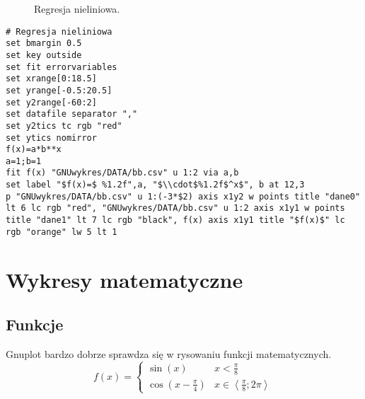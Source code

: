 \documentclass[a4paper,titlepage,12pt]{mwart}
\numberwithin{equation}{section}	%
\numberwithin{table}{section}           %
\numberwithin{figure}{section}          %
\begin{document}
\begin{figure}[!ht]
\begin{center}
\begin{scriptsize}
\end{scriptsize}
\end{center}
\caption{Regresja nieliniowa.}
\end{figure}
\begin{lstlisting}
# Regresja nieliniowa
set bmargin 0.5
set key outside
set fit errorvariables
set xrange[0:18.5]
set yrange[-0.5:20.5]
set y2range[-60:2]
set datafile separator ","
set y2tics tc rgb "red"
set ytics nomirror
f(x)=a*b**x
a=1;b=1
fit f(x) "GNUwykres/DATA/bb.csv" u 1:2 via a,b
set label "$f(x)=$ %1.2f",a, "$\\cdot$%1.2f$^x$", b at 12,3
p "GNUwykres/DATA/bb.csv" u 1:(-3*$2) axis x1y2 w points title "dane0" lt 6 lc rgb "red", "GNUwykres/DATA/bb.csv" u 1:2 axis x1y1 w points title "dane1" lt 7 lc rgb "black", f(x) axis x1y1 title "$f(x)$" lc rgb "orange" lw 5 lt 1
\end{lstlisting}

\section{Wykresy matematyczne}
\subsection{Funkcje}
Gnuplot bardzo dobrze sprawdza się w rysowaniu funkcji matematycznych. 
\begin{equation*}
f(x) = \begin{cases}
\sin(x) &x<\frac{\pi}{8}\\
\cos\left(x-\frac{\pi}{4}\right) &x\in\left\langle \frac{\pi}{8};2\pi\right\rangle
\end{cases}
\end{equation*}
\end{document}
